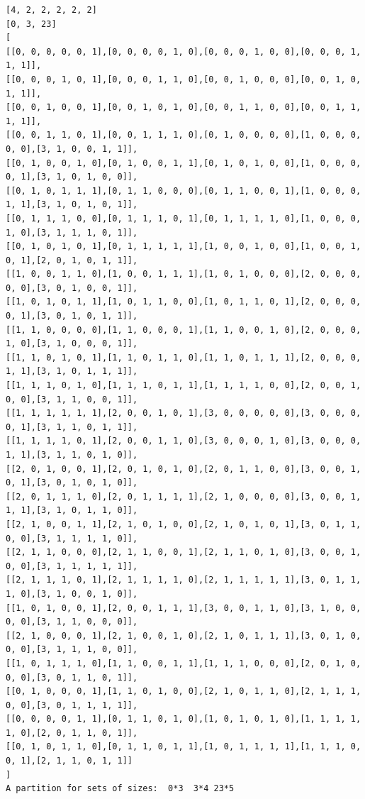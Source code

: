 \documentclass[final]{dmtcs-episciences}
\begin{document}
\begin{appendices}
\begin{verbatim} 
[4, 2, 2, 2, 2, 2]
[0, 3, 23]
[
[[0, 0, 0, 0, 0, 1],[0, 0, 0, 0, 1, 0],[0, 0, 0, 1, 0, 0],[0, 0, 0, 1, 1, 1]],
[[0, 0, 0, 1, 0, 1],[0, 0, 0, 1, 1, 0],[0, 0, 1, 0, 0, 0],[0, 0, 1, 0, 1, 1]],
[[0, 0, 1, 0, 0, 1],[0, 0, 1, 0, 1, 0],[0, 0, 1, 1, 0, 0],[0, 0, 1, 1, 1, 1]],
[[0, 0, 1, 1, 0, 1],[0, 0, 1, 1, 1, 0],[0, 1, 0, 0, 0, 0],[1, 0, 0, 0, 0, 0],[3, 1, 0, 0, 1, 1]],
[[0, 1, 0, 0, 1, 0],[0, 1, 0, 0, 1, 1],[0, 1, 0, 1, 0, 0],[1, 0, 0, 0, 0, 1],[3, 1, 0, 1, 0, 0]],
[[0, 1, 0, 1, 1, 1],[0, 1, 1, 0, 0, 0],[0, 1, 1, 0, 0, 1],[1, 0, 0, 0, 1, 1],[3, 1, 0, 1, 0, 1]],
[[0, 1, 1, 1, 0, 0],[0, 1, 1, 1, 0, 1],[0, 1, 1, 1, 1, 0],[1, 0, 0, 0, 1, 0],[3, 1, 1, 1, 0, 1]],
[[0, 1, 0, 1, 0, 1],[0, 1, 1, 1, 1, 1],[1, 0, 0, 1, 0, 0],[1, 0, 0, 1, 0, 1],[2, 0, 1, 0, 1, 1]],
[[1, 0, 0, 1, 1, 0],[1, 0, 0, 1, 1, 1],[1, 0, 1, 0, 0, 0],[2, 0, 0, 0, 0, 0],[3, 0, 1, 0, 0, 1]],
[[1, 0, 1, 0, 1, 1],[1, 0, 1, 1, 0, 0],[1, 0, 1, 1, 0, 1],[2, 0, 0, 0, 0, 1],[3, 0, 1, 0, 1, 1]],
[[1, 1, 0, 0, 0, 0],[1, 1, 0, 0, 0, 1],[1, 1, 0, 0, 1, 0],[2, 0, 0, 0, 1, 0],[3, 1, 0, 0, 0, 1]],
[[1, 1, 0, 1, 0, 1],[1, 1, 0, 1, 1, 0],[1, 1, 0, 1, 1, 1],[2, 0, 0, 0, 1, 1],[3, 1, 0, 1, 1, 1]],
[[1, 1, 1, 0, 1, 0],[1, 1, 1, 0, 1, 1],[1, 1, 1, 1, 0, 0],[2, 0, 0, 1, 0, 0],[3, 1, 1, 0, 0, 1]],
[[1, 1, 1, 1, 1, 1],[2, 0, 0, 1, 0, 1],[3, 0, 0, 0, 0, 0],[3, 0, 0, 0, 0, 1],[3, 1, 1, 0, 1, 1]],
[[1, 1, 1, 1, 0, 1],[2, 0, 0, 1, 1, 0],[3, 0, 0, 0, 1, 0],[3, 0, 0, 0, 1, 1],[3, 1, 1, 0, 1, 0]],
[[2, 0, 1, 0, 0, 1],[2, 0, 1, 0, 1, 0],[2, 0, 1, 1, 0, 0],[3, 0, 0, 1, 0, 1],[3, 0, 1, 0, 1, 0]],
[[2, 0, 1, 1, 1, 0],[2, 0, 1, 1, 1, 1],[2, 1, 0, 0, 0, 0],[3, 0, 0, 1, 1, 1],[3, 1, 0, 1, 1, 0]],
[[2, 1, 0, 0, 1, 1],[2, 1, 0, 1, 0, 0],[2, 1, 0, 1, 0, 1],[3, 0, 1, 1, 0, 0],[3, 1, 1, 1, 1, 0]],
[[2, 1, 1, 0, 0, 0],[2, 1, 1, 0, 0, 1],[2, 1, 1, 0, 1, 0],[3, 0, 0, 1, 0, 0],[3, 1, 1, 1, 1, 1]],
[[2, 1, 1, 1, 0, 1],[2, 1, 1, 1, 1, 0],[2, 1, 1, 1, 1, 1],[3, 0, 1, 1, 1, 0],[3, 1, 0, 0, 1, 0]],
[[1, 0, 1, 0, 0, 1],[2, 0, 0, 1, 1, 1],[3, 0, 0, 1, 1, 0],[3, 1, 0, 0, 0, 0],[3, 1, 1, 0, 0, 0]],
[[2, 1, 0, 0, 0, 1],[2, 1, 0, 0, 1, 0],[2, 1, 0, 1, 1, 1],[3, 0, 1, 0, 0, 0],[3, 1, 1, 1, 0, 0]],
[[1, 0, 1, 1, 1, 0],[1, 1, 0, 0, 1, 1],[1, 1, 1, 0, 0, 0],[2, 0, 1, 0, 0, 0],[3, 0, 1, 1, 0, 1]],
[[0, 1, 0, 0, 0, 1],[1, 1, 0, 1, 0, 0],[2, 1, 0, 1, 1, 0],[2, 1, 1, 1, 0, 0],[3, 0, 1, 1, 1, 1]],
[[0, 0, 0, 0, 1, 1],[0, 1, 1, 0, 1, 0],[1, 0, 1, 0, 1, 0],[1, 1, 1, 1, 1, 0],[2, 0, 1, 1, 0, 1]],
[[0, 1, 0, 1, 1, 0],[0, 1, 1, 0, 1, 1],[1, 0, 1, 1, 1, 1],[1, 1, 1, 0, 0, 1],[2, 1, 1, 0, 1, 1]]
]
A partition for sets of sizes:  0*3  3*4 23*5


\end{verbatim}
\end{appendices}
\end{document}
